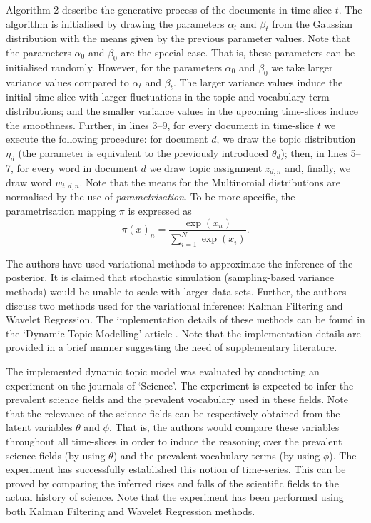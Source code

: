 \documentclass{mprop}
\begin{document}
Algorithm 2 describe the generative process of the documents in time-slice $t$. The algorithm is initialised by drawing the parameters $\alpha_t$ and $\beta_t$ from the Gaussian distribution with the means given by the previous parameter values. Note that the parameters $\alpha_0$ and $\beta_0$ are the special case. That is, these parameters can be initialised randomly. However, for the parameters $\alpha_0$ and $\beta_0$ we take larger variance values compared to $\alpha_t$ and $\beta_t$. The larger variance values  induce the initial time-slice with larger fluctuations in the topic and vocabulary term distributions; and the smaller variance values in the upcoming time-slices induce the smoothness. Further, in lines 3--9, for every document in time-slice $t$ we execute the following procedure: for document $d$, we draw the topic distribution $\eta_d$ (the parameter is equivalent to the previously introduced $\theta_d$); then, in lines 5--7, for every word in document $d$ we draw topic assignment $z_{d, n}$ and, finally, we draw word $w_{t, d, n}$. Note that the means for the Multinomial distributions are normalised by the use of \textit{parametrisation}. To be more specific, the parametrisation mapping $\pi$ is expressed as
\begin{equation}
\pi(x)_n = \dfrac{\exp{(x_n)}}{\sum^N_{i=1}\exp{(x_i)}}.
\end{equation}

\par The authors have used variational methods to approximate the inference of the posterior. It is claimed that stochastic simulation (sampling-based variance methods) would be unable to scale with larger data sets. Further, the authors discuss two methods used for the variational inference: Kalman Filtering and Wavelet Regression. The implementation details of these methods can be found in the `Dynamic Topic Modelling' article \cite{blei_2006}. Note that the implementation details are provided in a brief manner suggesting the need of supplementary literature. 

\par The implemented dynamic topic model was evaluated by conducting an experiment on the journals of `Science'. The experiment is expected to infer the prevalent science fields and the prevalent vocabulary used in these fields. Note that the relevance of the science fields can be respectively obtained from the latent variables $\theta$ and $\phi$. That is, the authors would compare these variables throughout all time-slices in order to induce the reasoning over the prevalent science fields (by using $\theta$) and the prevalent vocabulary terms (by using $\phi$). The experiment has successfully established this notion of time-series. This can be proved by comparing the inferred rises and falls of the scientific fields to the actual history of science. Note that the experiment has been performed using both Kalman Filtering and Wavelet Regression methods. 
\end{document}
